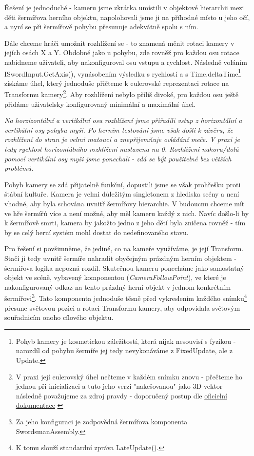 Řešení je jednoduché - kameru jsme zkrátka umístili v objektové hierarchii mezi děti šermířova herního objektu, napolohovali jsme ji na příhodné místo u jeho očí, a nyní se při šermířově pohybu přesunuje adekvátně spolu s ním. 

Dále chceme hráči umožnit rozhlížení se - to znamená měnit rotaci kamery v jejích osách X a Y. Obdobně jako u pohybu, zde rovněž pro každou osu rotace nabídneme uživateli, aby nakonfiguroval osu vstupu a rychlost. Následně voláním ISwordInput.GetAxis(), vynásobením výsledku s rychlostí a s Time.deltaTime\footnote{Pohyb kamery je kosmetickou záležitostí, která nijak nesouvisí s fyzikou - narozdíl od pohybu šermíře jej tedy nevykonáváme z FixedUpdate, ale z Update.} získáme úhel, který jednoduše přičteme k eulerovské reprezentaci rotace na Transformu kamery\footnote{V praxi její eulerovský úhel nečteme v každém snímku znovu - přečteme ho jednou při inicializaci a tuto jeho verzi "nakešovanou" jako 3D vektor následně považujeme za zdroj pravdy - doporučený postup dle \href{https://docs.unity3d.com/2022.2/Documentation/ScriptReference/Quaternion-eulerAngles.html}{\underline{oficielní dokumentace}} \cite{Unity}}. Aby rozhlížení nebylo příliš divoké, pro každou osu ještě přidáme uživatelsky konfigurovaný minimální a maximální úhel.

\textit{Na horzizontální a vertikální osu rozhlížení jsme přiřadili vstup z horizontální a vertikální osy pohybu myši. Po herním testování jsme však došli k závěru, že rozhlížení do stran je velmi matoucí a znepřijemňuje ovládání meče. V praxi je tedy rychlost horizontálního rozhlížení nastavena na 0. Rozhlížení nahoru/dolů pomocí vertikální osy myši jsme ponechali - zdá se být použitelné bez větších problémů.}

Pohyb kamery se zdá přijatelně funkční, dopustili jsme se však prohřešku proti štábní kultuře. Kamera je velmi důležitým singletonem z hlediska scény a není vhodné, aby byla schována uvnitř šermířovy hierarchie. V budoucnu chceme mít ve hře šermířů více a není možné, aby měl kameru každý z nich. Navíc došlo-li by k šermířově smrti, kamera by jakožto jedno z jeho dětí byla zničena rovněž - tím by se celý herní systém mohl dostat do nedefinovaného stavu.

Pro řešení si povšimněme, že jediné, co na kameře využíváme, je její Transform. Stačí ji tedy uvnitř šermíře nahradit obyčejným prázdným herním objektem - šermířova logika nepozná rozdíl. Skutečnou kameru ponecháme jako samostatný objekt ve scéně, vybavený komponentou (\textit{CameraFollowPoint}), ve které je nakonfigurovaný odkaz na tento prázdný herní objekt v jednom konkrétním šermířovi\footnote{Za jeho konfiguraci je zodpovědná šermířova komponenta SwordsmanAssembly.}. Tato komponenta jednoduše těsně před vykreslením každého snímku\footnote{K tomu slouží standardní zpráva LateUpdate().} přesune světovou pozici a rotaci Transformu kamery, aby odpovídala světovým souřadnicím onoho cílového objektu. 

